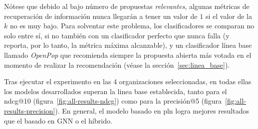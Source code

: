 
Nótese que debido al bajo número de propuestas \textit{relevantes}, algunas métricas de recuperación de información nunca llegarán a tener un valor de $1$ si el valor de la $k$ no es muy bajo. Para solventar este problema, los clasificadores se comparan no solo entre sí, si no también con un clasificador perfecto que nunca falla (y reporta, por lo tanto, la métrica máxima alcanzable), y un clasificador línea base llamado \textit{OpenPop} que recomienda siempre la propuesta abierta más votada en el momento de realizar la recomendación (véase la sección~\ref{sec:linea_base}).

Tras ejecutar el experimento en las 4 organizaciones seleccionadas, en todas ellas los modelos desarrollados superan la linea base establecida, tanto para el ndcg@10 (figura~\ref{fig:all-results-ndcg}) como para la precisión@5 (figura~\ref{fig:all-results-precision}). En general, el modelo basado en \gls{pln} logra mejores resultados que el basado en GNN o el híbrido.

